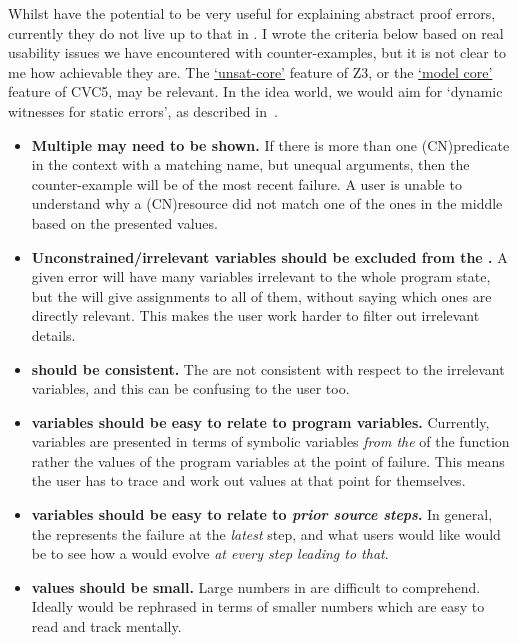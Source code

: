 Whilst  have the potential to be very useful for explaining
abstract proof errors, currently they do not live up to that in .
I wrote the criteria below based on real usability issues we have encountered
with counter-examples, but it is not clear to me how achievable they are. The
\href{https://github.com/Z3Prover/z3/issues/3964}{`unsat-core'} feature of Z3,
or the
\href{https://cvc5.github.io/blog/2024/04/15/interfaces-for-understanding-cvc5.html}{`model
core'} feature of CVC5, may be relevant. In the idea world, we would aim
for `dynamic witnesses for static errors', as described
in~.
\begin{itemize}
    \item \textbf{Multiple  may need to be shown.}
        If there is more than one \kl(CN){predicate} in the context with a
        matching name, but unequal arguments, then the counter-example will be of
        the most recent failure. A user is unable to understand why a
        \kl(CN){resource} did not match one of the ones in the middle based on
        the presented values.
    \item \textbf{Unconstrained/irrelevant variables should be excluded from the
        .} A given error will have many variables
        irrelevant to the whole program state, but the 
        will give assignments to all of them, without saying which ones are
        directly relevant. This makes the user work harder to filter out
        irrelevant details.
    \item \textbf{ should be consistent.} The
         are not consistent with respect to the
        irrelevant variables, and this can be confusing to the user too.
    \item \textbf{ variables should be easy to relate to
        program variables.} Currently,  variables are
        presented in terms of symbolic variables \emph{from the
        } of the function rather the values of the program
        variables at the point of failure. This means the user has to trace and
        work out values at that point for themselves.
    \item \textbf{ variables should be easy to relate to
        \emph{prior source steps}.} In general, the 
        represents the failure at the \emph{latest} step, and what users would
        like would be to see how a  would evolve \emph{at
        every step leading to that}.
    \item \textbf{ values should be small.} Large numbers
        in  are difficult to comprehend. Ideally
         would be rephrased in terms of smaller numbers
        which are easy to read and track mentally.
\end{itemize}

